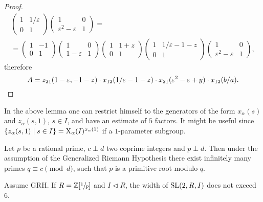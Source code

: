\begin{proof}
\begin{multline*}
\begin{pmatrix} 1 & 1/\varepsilon \\ 0 & 1 \end{pmatrix}
\begin{pmatrix} 1 & 0 \\ \varepsilon^2-\varepsilon & 1 \end{pmatrix} =\\=
\begin{pmatrix} 1 & -1 \\ 0 & 1 \end{pmatrix}
\begin{pmatrix} 1 & 0 \\ 1-\varepsilon & 1 \end{pmatrix}
\begin{pmatrix} 1 & 1+z \\ 0 & 1 \end{pmatrix}
\begin{pmatrix} 1 & 1/\varepsilon-1-z \\ 0 & 1 \end{pmatrix}
\begin{pmatrix} 1 & 0 \\ \varepsilon^2-\varepsilon & 1 \end{pmatrix},
\end{multline*}
therefore
\[
A=z_{21}(1-\varepsilon,-1-z)\cdot x_{12}(1/\varepsilon-1-z)\cdot x_{21}(\varepsilon^2-\varepsilon+y)\cdot x_{12}(b/a). \qedhere
\]
\end{proof}
\begin{rem}
In the above lemma one can restrict himself to the generators of the form $x_\alpha(s)$ and $z_\alpha(s,1)$, $s\in I$, and have an estimate of $5$ factors. It might be useful since $\left\{z_\alpha(s,1)\mid s\in I\right\}=\operatorname{X}_\alpha(I)^{x_\alpha(1)}$ if a $1$-parameter subgroup.
\end{rem}
\begin{lemma}
Let $p$ be a rational prime, $c\perp d$ two coprime integers and $p\perp d$. Then under the assumption of the Generalized Riemann Hypothesis there exist infinitely many primes $q\equiv c\pmod{d}$, such that $p$ is a primitive root modulo $q$.
\end{lemma}
\begin{lemma}\label{lemma:Z1p}
Assume GRH. If $R=\mathbb{Z}[\sfrac{1}{p}]$ and $I\lhd R$, the width of $\operatorname{SL}(2,R,I)$ does not exceed $6$.
\end{lemma}
